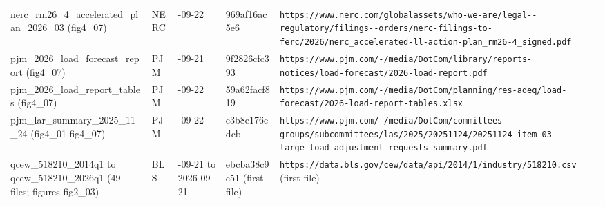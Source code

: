\begin{longtable}{>{\raggedright\arraybackslash}p{3.0cm}>{\raggedright\arraybackslash}p{1.5cm}>{\raggedright\arraybackslash}p{1.4cm}>{\raggedright\arraybackslash}p{2.0cm}>{\raggedright\arraybackslash}p{6.0cm}}
nerc\_\allowbreak{}rm26\_\allowbreak{}4\_\allowbreak{}accelerated\_\allowbreak{}plan\_\allowbreak{}2026\_\allowbreak{}03 (fig4\_\allowbreak{}07) & NERC & 2026-09-22 & 969af16ac5e6 & \texttt{https:\allowbreak{}/\allowbreak{}/\allowbreak{}www.\allowbreak{}nerc.\allowbreak{}com/\allowbreak{}globalassets/\allowbreak{}who-\allowbreak{}we-\allowbreak{}are/\allowbreak{}legal-\allowbreak{}-\allowbreak{}regulatory/\allowbreak{}filings-\allowbreak{}-\allowbreak{}orders/\allowbreak{}nerc-\allowbreak{}filings-\allowbreak{}to-\allowbreak{}ferc/\allowbreak{}2026/\allowbreak{}nerc\_\allowbreak{}accelerated-\allowbreak{}ll-\allowbreak{}action-\allowbreak{}plan\_\allowbreak{}rm26-\allowbreak{}4\_\allowbreak{}signed.\allowbreak{}pdf} \\
pjm\_\allowbreak{}2026\_\allowbreak{}load\_\allowbreak{}forecast\_\allowbreak{}report (fig4\_\allowbreak{}07) & PJM & 2026-09-21 & 9f2826cfc393 & \texttt{https:\allowbreak{}/\allowbreak{}/\allowbreak{}www.\allowbreak{}pjm.\allowbreak{}com/\allowbreak{}-\allowbreak{}/\allowbreak{}media/\allowbreak{}DotCom/\allowbreak{}library/\allowbreak{}reports-\allowbreak{}notices/\allowbreak{}load-\allowbreak{}forecast/\allowbreak{}2026-\allowbreak{}load-\allowbreak{}report.\allowbreak{}pdf} \\
pjm\_\allowbreak{}2026\_\allowbreak{}load\_\allowbreak{}report\_\allowbreak{}tables (fig4\_\allowbreak{}07) & PJM & 2026-09-22 & 59a62facf819 & \texttt{https:\allowbreak{}/\allowbreak{}/\allowbreak{}www.\allowbreak{}pjm.\allowbreak{}com/\allowbreak{}-\allowbreak{}/\allowbreak{}media/\allowbreak{}DotCom/\allowbreak{}planning/\allowbreak{}res-\allowbreak{}adeq/\allowbreak{}load-\allowbreak{}forecast/\allowbreak{}2026-\allowbreak{}load-\allowbreak{}report-\allowbreak{}tables.\allowbreak{}xlsx} \\
pjm\_\allowbreak{}lar\_\allowbreak{}summary\_\allowbreak{}2025\_\allowbreak{}11\_\allowbreak{}24 (fig4\_\allowbreak{}01 fig4\_\allowbreak{}07) & PJM & 2026-09-22 & c3b8e176edcb & \texttt{https:\allowbreak{}/\allowbreak{}/\allowbreak{}www.\allowbreak{}pjm.\allowbreak{}com/\allowbreak{}-\allowbreak{}/\allowbreak{}media/\allowbreak{}DotCom/\allowbreak{}committees-\allowbreak{}groups/\allowbreak{}subcommittees/\allowbreak{}las/\allowbreak{}2025/\allowbreak{}20251124/\allowbreak{}20251124-\allowbreak{}item-\allowbreak{}03-\allowbreak{}-\allowbreak{}-\allowbreak{}large-\allowbreak{}load-\allowbreak{}adjustment-\allowbreak{}requests-\allowbreak{}summary.\allowbreak{}pdf} \\
qcew\_\allowbreak{}518210\_\allowbreak{}2014q1 to qcew\_\allowbreak{}518210\_\allowbreak{}2026q1 (49 files; figures fig2\_\allowbreak{}03) & BLS & 2026-09-21 to 2026-09-21 & ebcba38c9c51 (first file) & \texttt{https:\allowbreak{}/\allowbreak{}/\allowbreak{}data.\allowbreak{}bls.\allowbreak{}gov/\allowbreak{}cew/\allowbreak{}data/\allowbreak{}api/\allowbreak{}2014/\allowbreak{}1/\allowbreak{}industry/\allowbreak{}518210.\allowbreak{}csv} (first file) \\

\end{longtable}
